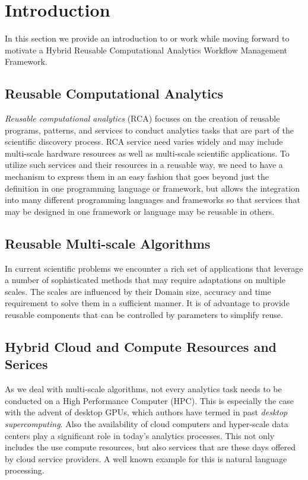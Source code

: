 
\section{Introduction}

In this section we provide an introduction to or work while 
moving forward to motivate a 
Hybrid Reusable Computational Analytics Workflow
Management Framework.

\subsection{Reusable Computational Analytics}

{\em Reusable computational analytics} (RCA) focuses on the creation of reusable programs, patterns, and services to conduct analytics tasks that are part of the scientific discovery process. RCA service need varies widely and may include multi-scale hardware resources as well as multi-scale scientific applications. To utilize such services and their resources in a reusable way, we need to have a mechanism to express them in an easy fashion that goes beyond just the definition in one programming language or framework, but allows the integration into many different programming languages and frameworks so that services that may be designed in one framework or language may be reusable in others.

\subsection{Reusable Multi-scale Algorithms}

In current scientific problems we encounter a rich set of applications that leverage a number of sophisticated methods that may require adaptations on multiple scales. The scales are influenced by their Domain size, accuracy and time requirement to solve them in a sufficient manner. It is of advantage to provide reusable components that can be controlled by parameters to simplify reuse.

\subsection{Hybrid Cloud and Compute Resources and Serices}

As we deal with multi-scale algorithms, not every analytics task needs to be conducted on a High Performance Computer (HPC). This is especially the case with the advent of desktop GPUs, which authors have termed in past {\em desktop supercomputing}. Also the availability of cloud computers and hyper-scale data centers play a significant role in today's analytics processes. This not only includes the use compute resources, but also services that are these days offered by cloud service providers. A well known example for this is natural language processing.

